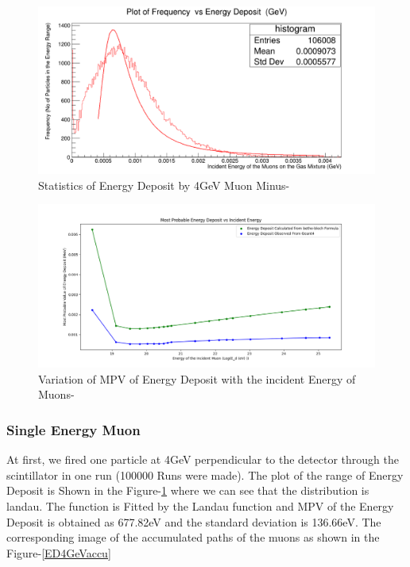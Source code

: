 \documentclass{article}
\begin{document}
\begin{multicols}{2}
\begin{figure}[H]
    \centering	
     \includegraphics[width=\columnwidth]{ED4GeV.png}
     \caption{Statistics of Energy Deposit by 4GeV Muon Minus-\cite{ROOT}}
     \label{ED4GeV}
\end{figure}




\begin{figure}[H]
    \centering	
     \includegraphics[width=\columnwidth]{betheplot.png}
     \caption{Variation of MPV of Energy Deposit with the incident Energy of Muons-\cite{python}}
     \label{betheplot}
\end{figure}


\subsubsection{Single Energy Muon}

At first, we fired one particle at 4GeV perpendicular
to the detector through the scintillator in one run (100000 Runs were made). The plot of the range of
Energy Deposit is Shown in the Figure-\ref{ED4GeV} where we can see
that the distribution is landau. The function is Fitted by the
Landau function and MPV of the Energy Deposit is obtained as 677.82eV and the standard deviation
is 136.66eV. The corresponding image of the accumulated paths of the muons
as shown in the Figure-\ref{ED4GeVaccu}











\end{multicols}
\end{document}
